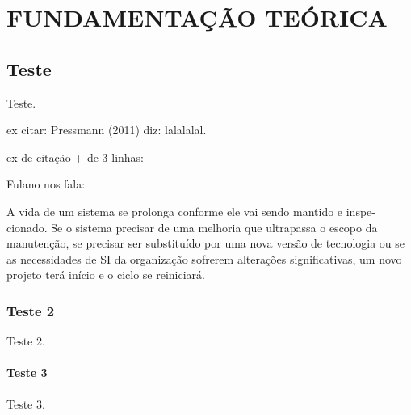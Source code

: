 \chapter{FUNDAMENTAÇÃO TEÓRICA}
	\thispagestyle{empty}

\section{Teste}

	Teste.
	
	ex citar: \nocite{PRESSMAN} Pressmann (2011) diz: lalalalal.
	
	ex de citação + de 3 linhas:
	
	Fulano nos fala:
	\begin{citacao}
			A vida de um sistema se prolonga conforme ele vai sendo mantido e inspe-cionado. Se o sistema precisar de uma melhoria que ultrapassa o escopo da manutenção, se precisar ser substituído por uma nova versão de tecnologia ou se as necessidades de SI da organização sofrerem alterações significativas, um novo projeto terá início e o ciclo se reiniciará.
		\end{citacao}
		
\subsection{Teste 2}
	Teste 2.
	
\subsubsection{Teste 3}
	Teste 3.

	

